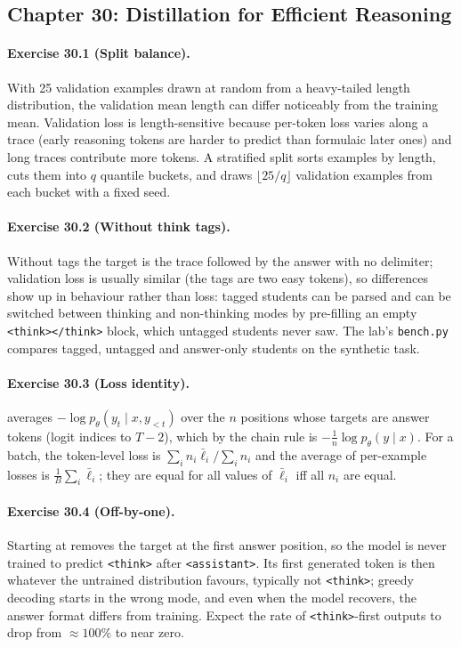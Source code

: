 \subsection*{Chapter 30: Distillation for Efficient Reasoning}

\paragraph{Exercise 30.1 (Split balance).}
With 25 validation examples drawn at random from a heavy-tailed length distribution, the
validation mean length can differ noticeably from the training mean. Validation loss is
length-sensitive because per-token loss varies along a trace (early reasoning tokens are harder
to predict than formulaic later ones) and long traces contribute more tokens. A stratified split
sorts examples by length, cuts them into $q$ quantile buckets, and draws
$\lfloor 25/q\rfloor$ validation examples from each bucket with a fixed seed.

\paragraph{Exercise 30.2 (Without think tags).}
Without tags the target is the trace followed by the answer with no delimiter; validation loss
is usually similar (the tags are two easy tokens), so differences show up in behaviour rather
than loss: tagged students can be parsed and can be switched between thinking and non-thinking
modes by pre-filling an empty \texttt{<think></think>} block, which untagged students never saw.
The lab's \texttt{bench.py} compares tagged, untagged and answer-only students on the synthetic
task.

\paragraph{Exercise 30.3 (Loss identity).}
 averages $-\log p_\theta(y_t\mid x,y_{<t})$ over the $n$ positions whose
targets are answer tokens (logit indices  to $T-2$), which by the chain rule is
$-\frac1n\log p_\theta(y\mid x)$. For a batch, the token-level loss is
$\sum_i n_i\bar\ell_i/\sum_i n_i$ and the average of per-example losses is $\frac1B\sum_i\bar\ell_i$;
they are equal for all values of $\bar\ell_i$ iff all $n_i$ are equal.

\paragraph{Exercise 30.4 (Off-by-one).}
Starting at  removes the target at the first answer position, so the model is
never trained to predict \texttt{<think>} after \texttt{<assistant>}. Its first generated token is
then whatever the untrained distribution favours, typically not \texttt{<think>}; greedy decoding
starts in the wrong mode, and even when the model recovers, the answer format differs from
training. Expect the rate of \texttt{<think>}-first outputs to drop from $\approx100\%$ to near zero.

